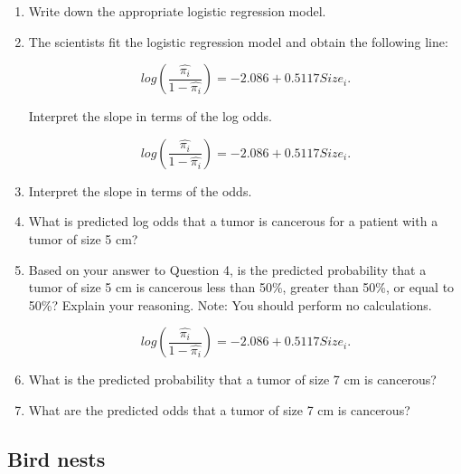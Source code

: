 \documentclass[11pt]{article}
\begin{document}
\begin{enumerate} 
\item Write down the appropriate logistic regression model.

\vspace{4cm} 

\item The scientists fit the logistic regression model and obtain the following line: 

$$log \left( \frac{\hat{\pi_i}}{1-\hat{\pi_i}} \right) = -2.086 + 0.5117Size_i.$$

Interpret the slope in terms of the log odds. 


\pagebreak

$$log \left( \frac{\hat{\pi_i}}{1-\hat{\pi_i}} \right) = -2.086 + 0.5117Size_i.$$

\item Interpret the slope in terms of the odds. 

\vspace{5cm} 

\item What is predicted log odds that a tumor is cancerous for a patient with a tumor of size 5 cm?

\vspace{5cm}

\item Based on your answer to Question 4, is the predicted probability that a tumor of size 5 cm is cancerous less than 50\%, greater than 50\%, or equal to 50\%? Explain your reasoning. Note: You should perform no calculations. 

\pagebreak 

$$log \left( \frac{\hat{\pi_i}}{1-\hat{\pi_i}} \right) = -2.086 + 0.5117Size_i.$$


\item What is the predicted probability that a tumor of size 7 cm is cancerous?

\vspace{7cm} 

\item What are the predicted odds that a tumor of size 7 cm is cancerous? 



\end{enumerate}

\newpage

\subsection{Bird nests}
\end{document}
